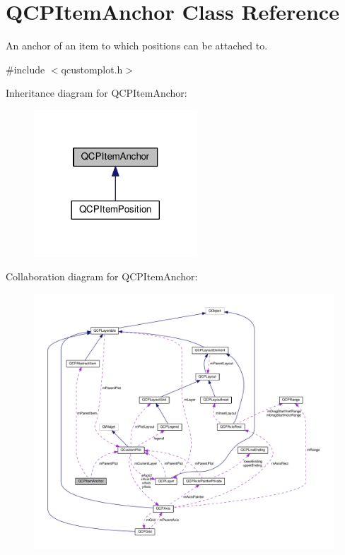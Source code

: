 \hypertarget{classQCPItemAnchor}{}\section{Q\+C\+P\+Item\+Anchor Class Reference}
\label{classQCPItemAnchor}


An anchor of an item to which positions can be attached to.  




{\ttfamily \#include $<$qcustomplot.\+h$>$}



Inheritance diagram for Q\+C\+P\+Item\+Anchor\+:
\nopagebreak
\begin{figure}[H]
\begin{center}
\leavevmode
\includegraphics[width=173pt]{classQCPItemAnchor__inherit__graph}
\end{center}
\end{figure}


Collaboration diagram for Q\+C\+P\+Item\+Anchor\+:
\nopagebreak
\begin{figure}[H]
\begin{center}
\leavevmode
\includegraphics[width=350pt]{classQCPItemAnchor__coll__graph}
\end{center}
\end{figure}
